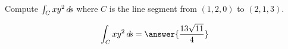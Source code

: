 \documentclass{ximera}
\author{David Guichard \and Neal Koblitz \and H. Jerome Keisler \and Albert Scheller \and Barry Balof \and Mike Wills \and Matthew Carr}
\begin{document}
\begin{exercise}




Compute $\int_C xy^2 \mathop{}\!d\! s$ where $C$ is the line segment from $(1,2,0)$ to $(2,1,3)$.

\begin{prompt}
\[
\int_C xy^2 \d s=\answer{\frac{13\sqrt{11}}{4}}
\]
\end{prompt}



\end{exercise}
\end{document}
